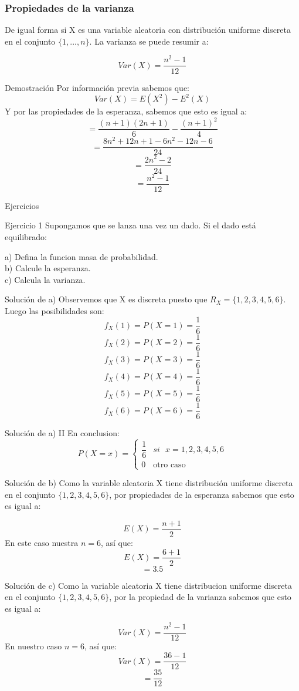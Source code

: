 \documentclass[11pt]{beamer}
\begin{document}
\begin{frame}\frametitle{Propiedades de la varianza}
De igual forma si X es una variable aleatoria  con distribución uniforme discreta en el conjunto $\lbrace 1,...,n \rbrace$. La varianza se puede resumir a:

$$Var(X) = \dfrac{n^{2} - 1}{12}$$

\end{frame}

\begin{frame}{Demostración}
Por información previa sabemos que:
$$Var(X) = E(X^2) - E^2(X)$$
Y por las propiedades de la esperanza, sabemos que esto es igual a:
$$= \dfrac{(n + 1)(2n + 1)}{6} - \dfrac{(n +1)^2}{4}$$
$$=\dfrac{8n^2 + 12n + 1 - 6n^2 - 12n - 6}{24}$$
$$= \dfrac{2n^2 - 2}{24}$$
$$= \dfrac{n^2 - 1}{12}$$
\end{frame}

\begin{frame}{Ejercicios}
\begin{block}{Ejercicio 1}
Supongamos que se lanza una vez un dado. Si el dado está equilibrado:

a) Defina la funcion masa de probabilidad.\\
b) Calcule la esperanza.\\
c) Calcula la varianza.
\end{block}
\end{frame}

\begin{frame}{Solución de a)}
Observemos que X es discreta puesto que $R_{X}=\lbrace 1, 2, 3, 4, 5, 6 \rbrace$. Luego las posibilidades son:
$$f_{X}(1)=P(X=1)=\dfrac{1}{6}$$
$$f_{X}(2)=P(X=2)=\dfrac{1}{6}$$
$$f_{X}(3)=P(X=3)=\dfrac{1}{6}$$
$$f_{X}(4)=P(X=4)=\dfrac{1}{6}$$
$$f_{X}(5)=P(X=5)=\dfrac{1}{6}$$
$$f_{X}(6)=P(X=6)=\dfrac{1}{6}$$
\end{frame}

\begin{frame} {Solución de a) II}
En conclusion:
$$
P(X = x)=\begin{cases}
{\dfrac{1}{6}} & si \mbox{ $x= 1,2 ,3, 4, 5, 6$}\\{0 }& \mbox{otro caso}\
\end{cases}
$$
\end{frame}

\begin{frame}{Solución de b)}
Como la variable aleatoria X tiene distribución uniforme discreta en el conjunto $\lbrace 1,2,3,4,5,6 \rbrace$, por propiedades de la esperanza sabemos que esto es igual a:

$$E(X)= \dfrac{n + 1}{2} $$
En este caso nuestra $n = 6$, así que:
$$E(X)= \dfrac{6 + 1}{2} $$
$$=3.5$$
\end{frame}
\begin{frame}{Solución de c)}
Como la variable aleatoria X tiene distribucion uniforme discreta en el conjunto $\lbrace 1,2,3,4,5,6 \rbrace$, por la propiedad de la varianza sabemos que esto es igual a:

$$Var(X) = \dfrac{n^{2} - 1}{12}$$
En nuestro caso $n=6$, así que:
$$Var(X) = \dfrac{36 - 1}{12}$$
$$=\dfrac{35}{12}$$
\end{frame} 
\end{document}
